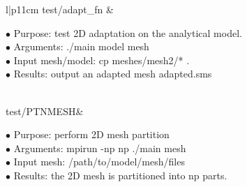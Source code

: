 \documentclass[11pt]{article}  %
\begin{document}
\begin{table}
\begin{center}
\begin{tabular}{l|p{11cm}}
   test/adapt\_fn & 

 {
 \begin{minipage}[t]{4.5in} \raggedright
  $\bullet$ Purpose: test 2D adaptation on the analytical model. \\
  $\bullet$ Arguments: ./main model mesh \\
  $\bullet$ Input mesh/model: cp meshes/mesh2/* .\\
  $\bullet$ Results: output an adapted mesh adapted.sms \\
 \end{minipage}
 } \\
\hline
   test/PTNMESH& 

 {
 \begin{minipage}[t]{4.5in} \raggedright
  $\bullet$ Purpose:  perform 2D mesh partition \\
  $\bullet$ Arguments: mpirun -np np ./main mesh \\
  $\bullet$ Input mesh: /path/to/model/mesh/files\\
  $\bullet$ Results: the 2D mesh is partitioned into np parts.\\
 \end{minipage}
 } \\

\hline
\end{tabular}
\end{center}
\end{table}
 
\end{document}
